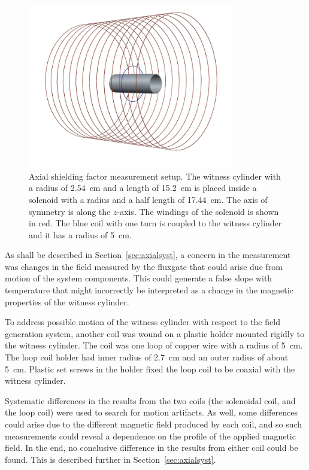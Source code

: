 \begin{figure}[h!]
\begin{center}
   \includegraphics[width=0.8\textwidth]{geometry.PNG}
    \caption{Axial shielding factor measurement setup. The witness
      cylinder with a radius of 2.54~cm and a length of 15.2~cm is placed
      inside a solenoid with a radius and a half length of
      17.44~cm. The axis of symmetry is along the $z$-axis. The
      windings of the solenoid is shown in red. The blue coil with one
      turn is coupled to the witness cylinder and it has a radius of
      5~cm.  }
    \label{fig:geometry}
    \end{center}
\end{figure}

As shall be described in Section~\ref{sec:axialsyst}, a concern in the
measurement was changes in the field measured by the fluxgate that
could arise due from motion of the system components.  This could
generate a false slope with temperature that might incorrectly be
interpreted as a change in the magnetic properties of the witness
cylinder.

To address possible motion of the witness cylinder with respect to the
field generation system, another coil was wound on a plastic holder
mounted rigidly to the witness cylinder.  The coil was one loop of
copper wire with a radius of 5~cm. The loop coil holder had inner
radius of 2.7~cm and an outer radius of about 5~cm.  Plastic set
screws in the holder fixed the loop coil to be coaxial with the
witness cylinder.

Systematic differences in the results from the two coils (the
solenoidal coil, and the loop coil) were used to search for motion
artifacts.  As well, some differences could arise due to the different
magnetic field produced by each coil, and so such measurements could
reveal a dependence on the profile of the applied magnetic field.  In
the end, no conclusive difference in the results from either coil
could be found.  This is described further in
Section~\ref{sec:axialsyst}.


